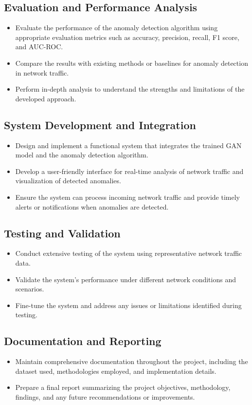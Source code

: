 \documentclass[12pt]{article}
\begin{document}
\subsection{ Evaluation and Performance Analysis}
\begin{itemize}
  \item Evaluate the performance of the anomaly detection algorithm using appropriate evaluation metrics such as accuracy, precision, recall, F1 score, and AUC-ROC.
  \item Compare the results with existing methods or baselines for anomaly detection in network traffic.
  \item Perform in-depth analysis to understand the strengths and limitations of the developed approach.
\end{itemize}

\subsection{ System Development and Integration}
\begin{itemize}
  \item Design and implement a functional system that integrates the trained GAN model and the anomaly detection algorithm.
  \item Develop a user-friendly interface for real-time analysis of network traffic and visualization of detected anomalies.
  \item Ensure the system can process incoming network traffic and provide timely alerts or notifications when anomalies are detected.
\end{itemize}

\subsection{ Testing and Validation}
\begin{itemize}
  \item Conduct extensive testing of the system using representative network traffic data.
  \item Validate the system's performance under different network conditions and scenarios.
  \item Fine-tune the system and address any issues or limitations identified during testing.
\end{itemize}

\subsection{ Documentation and Reporting}
\begin{itemize}
  \item Maintain comprehensive documentation throughout the project, including the dataset used, methodologies employed, and implementation details.
  \item Prepare a final report summarizing the project objectives, methodology, findings, and any future recommendations or improvements.
\end{itemize}
\end{document}
